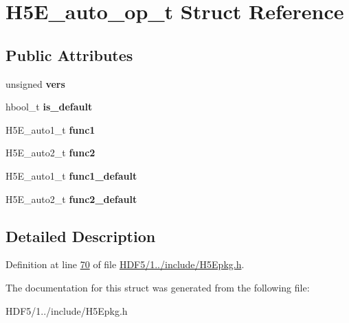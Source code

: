 \hypertarget{struct_h5_e__auto__op__t}{}\section{H5\+E\+\_\+auto\+\_\+op\+\_\+t Struct Reference}
\label{struct_h5_e__auto__op__t}
\subsection*{Public Attributes}
\begin{DoxyCompactItemize}
\item 
\mbox{\label{struct_h5_e__auto__op__t_ab73c0792629d627a058f5f9bb26521b4}} 
unsigned {\bfseries vers}
\item 
\mbox{\label{struct_h5_e__auto__op__t_a0c07c1b8fe66ce545867710705d41090}} 
hbool\+\_\+t {\bfseries is\+\_\+default}
\item 
\mbox{\label{struct_h5_e__auto__op__t_a55e125cf4aee4d827f242990ea8ba063}} 
H5\+E\+\_\+auto1\+\_\+t {\bfseries func1}
\item 
\mbox{\label{struct_h5_e__auto__op__t_ac4019acca0ea4e78594845e3561f1aa8}} 
H5\+E\+\_\+auto2\+\_\+t {\bfseries func2}
\item 
\mbox{\label{struct_h5_e__auto__op__t_a8990328480d15f3dda53ed9cbbb676d6}} 
H5\+E\+\_\+auto1\+\_\+t {\bfseries func1\+\_\+default}
\item 
\mbox{\label{struct_h5_e__auto__op__t_aba5cf3eeff7c2d2591e2bfbdce969a15}} 
H5\+E\+\_\+auto2\+\_\+t {\bfseries func2\+\_\+default}
\end{DoxyCompactItemize}


\subsection{Detailed Description}


Definition at line \hyperlink{_h_d_f5_21_810_81_2include_2_h5_epkg_8h_source_l00070}{70} of file \hyperlink{_h_d_f5_21_810_81_2include_2_h5_epkg_8h_source}{H\+D\+F5/1../include/\+H5\+Epkg.\+h}.



The documentation for this struct was generated from the following file\+:\begin{DoxyCompactItemize}
\item 
H\+D\+F5/1../include/\+H5\+Epkg.\+h\end{DoxyCompactItemize}
